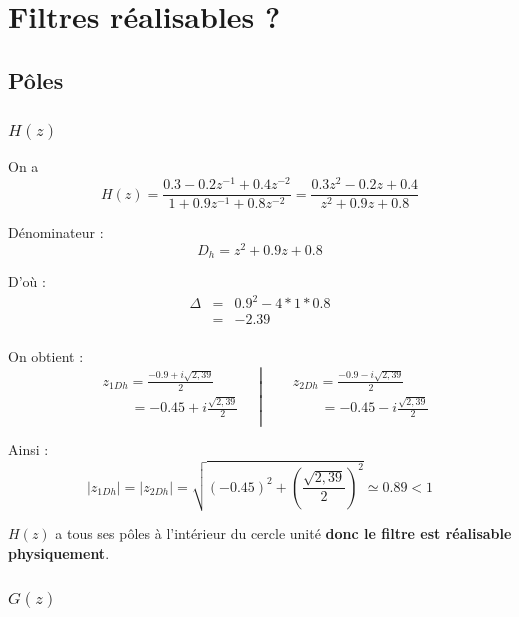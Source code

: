 \documentclass[12,french]{report}
\begin{document}
\chapter{Filtres réalisables ?}

\section{Pôles}

\subsection{$H(z)$}

\vspace{0.25cm}

On a $$ H(z) = \frac{0.3-0.2z^{-1}+0.4z^{-2}}{1+0.9z^{-1}+0.8z^{-2}} = \frac{0.3z^2-0.2z+0.4}{z^2+0.9z+0.8} $$

Dénominateur : $$ D_h= z^2+0.9z+0.8 $$

D'où : $$ \begin{array}{ccl}
\Delta & = & 0.9^2-4*1*0.8 \\
	   & = & -2.39 \\
\end{array} $$

On obtient :
$$\left.\begin{aligned}
	&z_{1Dh} = \frac{-0.9+i\sqrt{2,39}}{2} \\
	&\quad\quad = -0.45 + i\frac{\sqrt{2,39}}{2} \\
\end{aligned}\quad\right|
\quad\left.\begin{aligned}
	&z_{2Dh} = \frac{-0.9-i\sqrt{2,39}}{2}\\
	&\quad\quad = -0.45 - i\frac{\sqrt{2,39}}{2} \\
\end{aligned}\right.$$

Ainsi :
$$ |z_{1Dh}|=|z_{2Dh}|=\sqrt{(-0.45)^2+\left(\frac{\sqrt{2,39}}{2}\right)^2} \simeq 0.89 < 1 $$


$H(z)$ a tous ses pôles à l'intérieur du cercle unité \textbf{donc le filtre est réalisable physiquement}.\\

\subsection{$G(z)$}

\vspace{0.25cm}
\end{document}
